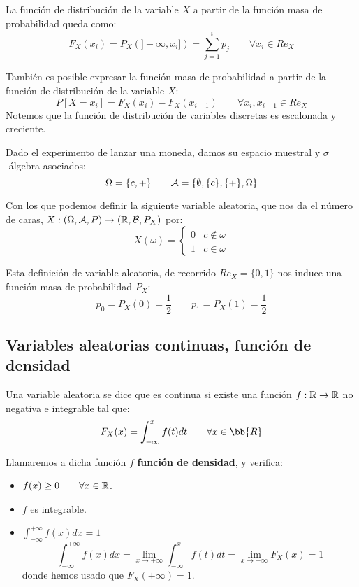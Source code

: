 La función de distribución de la variable $X$ a partir de la función masa de probabilidad queda como:
$$F_X(x_i) = P_X(]-\infty, x_i]) = \sum_{j=1}^i p_j \qquad \forall x_i \in Re_X$$


También es posible expresar la función masa de probabilidad a partir de la función de distribución de la variable $X$:
$$P[X=x_i] = F_X(x_i) - F_X(x_{i-1}) \qquad \forall x_i,x_{i-1}\in Re_X$$
Notemos que la función de distribución de variables discretas es escalonada y creciente.

\begin{ejemplo}
    Dado el experimento de lanzar una moneda, damos su espacio muestral y $\sigma$-álgebra asociados:
    $$\Omega = \{c, +\} \qquad \mathcal{A}=\{\emptyset, \{c\}, \{+\}, \Omega\}$$
    
    Con los que podemos definir la siguiente variable aleatoria, que nos da el número de caras,
    $X:(\Omega, \mathcal{A}, P) \rightarrow (\mathbb R, \mathcal{B}, P_X)$ por:
    $$X(\omega) = \left\{ \begin{array}{cc}
        0 & c \notin \omega \\
        1 & c \in \omega
    \end{array} \right.$$
    
    Esta definición de variable aleatoria, de recorrido $Re_X = \{0,1\}$ nos induce una función masa de probabilidad $P_X$:
    $$p_0 = P_X(0) = \frac{1}{2} \qquad p_1 = P_X(1) = \frac{1}{2}$$
\end{ejemplo}

\subsection{Variables aleatorias continuas, función de densidad}

\begin{definicion}
    Una variable aleatoria se dice que es continua si existe una función $f:\mathbb R \rightarrow \mathbb R$ no negativa e integrable tal que:
    $$F_X(x) = \int_{-\infty}^x f(t) dt\qquad \forall x\in \bb{R}$$
\end{definicion}

Llamaremos a dicha función $f$ \textbf{función de densidad}, y verifica:
\begin{itemize}
  \item $f(x) \geq 0 \qquad \forall x \in \mathbb R$.
  \item $f$ es integrable.
  \item $\displaystyle \int_{-\infty}^{+\infty}f(x) dx = 1$
  \begin{equation*}
      \int_{-\infty}^{+\infty}f(x) dx = \lim_{x\to +\infty} \int_{-\infty}^x f(t) dt = \lim_{x\to +\infty} F_X(x) = 1
  \end{equation*}
  donde hemos usado que $F_X(+\infty) = 1$.
\end{itemize}

